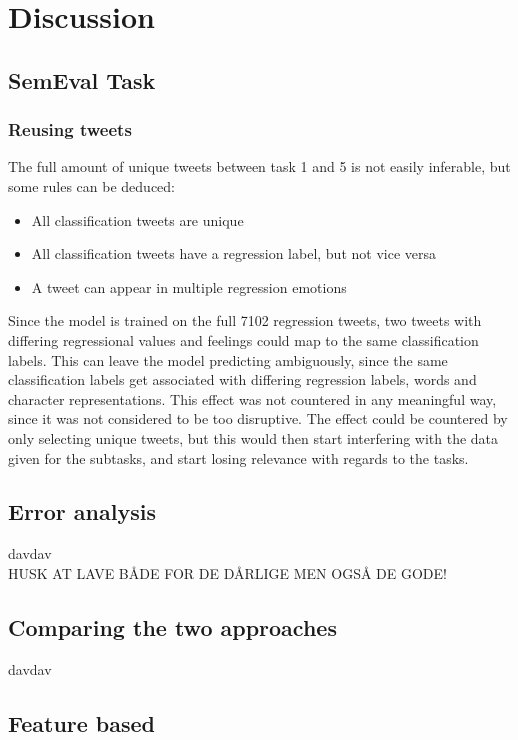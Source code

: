 
\section{Discussion}

\subsection{SemEval Task}
\subsubsection{Reusing tweets}
The full amount of unique tweets between task 1 and 5 is not easily inferable, but some rules can be deduced:\\
\begin{itemize}
\item All classification tweets are unique
\item All classification tweets have a regression label, but not vice versa
\item A tweet can appear in multiple regression emotions
\end{itemize}
Since the model is trained on the full 7102 regression tweets, two tweets with differing regressional values and feelings could map to the same classification labels. This can leave the model predicting ambiguously, since the same classification labels get associated with differing regression labels, words and character representations. This effect was not countered in any meaningful way, since it was not considered to be too disruptive. The effect could be countered by only selecting unique tweets, but this would then start interfering with the data given for the subtasks, and start losing relevance with regards to the tasks. 

\subsection{Error analysis}
davdav\\
HUSK AT LAVE BÅDE FOR DE DÅRLIGE MEN OGSÅ DE GODE!

\subsection{Comparing the two approaches}
davdav

\subsection{Feature based}
